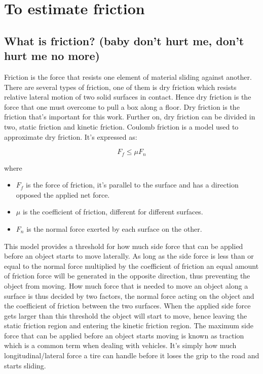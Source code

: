 \chapter{To estimate friction}

\section{What is friction? (baby don't hurt me, don't hurt me no more)}
Friction is the force that resists one element of material sliding against another. There are several types of friction, one of them is dry friction which resists relative lateral motion of two solid surfaces in contact. Hence dry friction is the force that one must overcome to pull a box along a floor. Dry friction is the friction that's important for this work. Further on, dry friction can be divided in two, static friction and kinetic friction. Coulomb friction is a model used to approximate dry friction. It's expressed as:

\begin{equation} \label{eq:friction}
F_{f}\leq\mu F_{n}
\end{equation}

where

\begin{itemize}
	\item $ F_{f} $ is the force of friction, it's parallel to the surface and has a direction opposed the applied net force.
	\item $ \mu $ is the coefficient of friction, different for different surfaces.
	\item $ F_{n} $ is the normal force exerted by each surface on the other.
\end{itemize}

This model provides a threshold for how much side force that can be applied before an object starts to move laterally. As long as the side force is less than or equal to the normal force multiplied by the coefficient of friction an equal amount of friction force will be generated in the opposite direction, thus preventing the object from moving. How much force that is needed to move an object along a surface is thus decided by two factors, the normal force acting on the object and the coefficient of friction between the two surfaces. When the applied side force gets larger than this threshold the object will start to move, hence leaving the static friction region and entering the kinetic friction region. The maximum side force that can be applied before an object starts moving is known as traction which is a common term when dealing with vehicles. It's simply how much longitudinal/lateral force a tire can handle before it loses the grip to the road and starts sliding.

